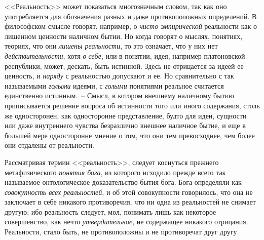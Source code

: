<<Реальность>> может показаться многозначным словом,
так как оно употребляется для обозначения разных
и даже противоположных определений. В философском
смысле говорят, например, о \emph{чисто эмпирической} реальности
как о лишенном ценности наличном бытии. Но
когда говорят о мыслях, понятиях, теориях, что они \emph{лишены
реальности}, то это означает, что у них нет \emph{действительности},
хотя \emph{в себе}, или в понятии, идея, например
платоновской республики, может, дескать, быть истинной.
Здесь не отрицается за идеей ее ценность, и \emph{наряду}
с реальностью допускают и ее. Но сравнительно с так называемыми
\emph{голыми} идеями, с \emph{голыми} понятиями реальное
считается единственно истинным.~-- Смысл, в котором
внешнему наличному бытию приписывается решение
вопроса об истинности того или иного содержания,
столь же односторонен, как односторонне представление,
будто для идеи, сущности или даже внутреннего чувства
безразлично внешнее наличное бытие, и еще в большей
мере односторонне мнение о том, что они тем превосходнее,
чем более они отдалены от реальности.

Рассматривая термин <<реальность>>, следует коснуться
прежнего метафизического \emph{понятия бога}, из которого
исходило прежде всего так называемое онтологическое
доказательство бытия бога. Бога определяли как \emph{совокупность
всех реальностей}, и об этой совокупности говорилось,
что она не заключает в себе никакого противоречия,
что ни одна из реальностей не снимает другую; ибо
реальность следует, мол, понимать лишь как некоторое
совершенство, как нечто \emph{утвердительное}, не содержащее
никакого отрицания. Реальности, стало быть, не противоположны
и не противоречат друг другу.

